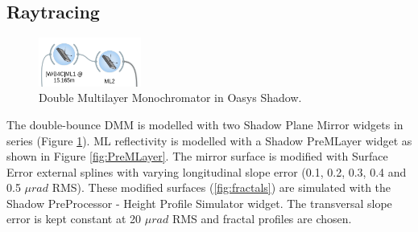 \subsection{Raytracing}
\begin{figure}
\centering
\includegraphics[width=0.3\textwidth]{images/DMM_oasys.png}
\caption{\label{fig:DMM_oasys} Double Multilayer Monochromator in Oasys Shadow.}
\end{figure}

The double-bounce DMM is modelled with two Shadow Plane Mirror widgets in series (Figure \ref{fig:DMM_oasys}). ML reflectivity is modelled with a Shadow PreMLayer widget as shown in Figure \ref{fig:PreMLayer}. The mirror surface is modified with Surface Error external splines with varying longitudinal slope error (0.1, 0.2, 0.3, 0.4 and 0.5 $\mu rad$ RMS). These modified surfaces (\ref{fig:fractals}) are simulated with the Shadow PreProcessor - Height Profile Simulator widget. The transversal slope error is kept constant at 20 $\mu rad$ RMS and fractal profiles are chosen. 

